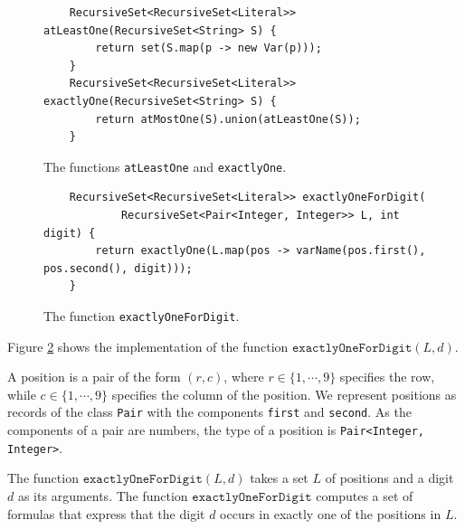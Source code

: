 \begin{figure}[!ht]
\centering
\begin{verbatim}
    RecursiveSet<RecursiveSet<Literal>> atLeastOne(RecursiveSet<String> S) {
        return set(S.map(p -> new Var(p)));
    }
    RecursiveSet<RecursiveSet<Literal>> exactlyOne(RecursiveSet<String> S) {
        return atMostOne(S).union(atLeastOne(S));
    }
\end{verbatim}
\vspace*{-0.3cm}
\caption{The functions \texttt{atLeastOne} and \texttt{exactlyOne}.}
\label{fig:sudoku-exactly}
\end{figure}



\begin{figure}[!ht]
\centering
\begin{verbatim}
    RecursiveSet<RecursiveSet<Literal>> exactlyOneForDigit(
            RecursiveSet<Pair<Integer, Integer>> L, int digit) {
        return exactlyOne(L.map(pos -> varName(pos.first(), pos.second(), digit)));
    }
\end{verbatim}
\vspace*{-0.3cm}
\caption{The function \texttt{exactlyOneForDigit}.}
\label{fig:sudoku-exactlyOneForDigit}
\end{figure}

Figure \ref{fig:sudoku-exactlyOneForDigit} shows the implementation of the function
$\texttt{exactlyOneForDigit}(L, d)$.

A position is a pair of the form $(r, c)$, where $r \in \{1,\cdots,9\}$
specifies the row, while $c \in \{1,\cdots,9\}$ specifies the column of the position.  We represent positions
as records of the class \texttt{Pair} with the components \texttt{first} and \texttt{second}.  As the
components of a pair are numbers, the type of a position is \texttt{Pair<Integer, Integer>}.

The function $\texttt{exactlyOneForDigit}(L, d)$ takes a set $L$ of positions and a digit $d$ as its arguments.
The function $\texttt{exactlyOneForDigit}$ computes a set of formulas that express that the digit $d$ 
occurs in exactly one of the positions in $L$.



